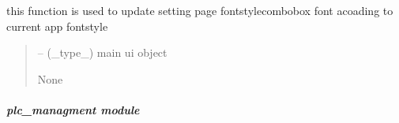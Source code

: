 \documentclass[letterpaper,10pt,english]{sphinxmanual}
\begin{document}

\begin{savenotes}\begin{fulllineitems}
\label{\detokenize{setting/backend/mainsetting_funcs:oxin.backend.mainsetting_funcs.update_combo_fontstyle}}
\pysigstartsignatures
{}
\pysigstopsignatures
\sphinxAtStartPar
this function is used to update setting page fontstyle\sphinxhyphen{}combobox font acoading to current app fontstyle
\begin{quote}\begin{description}
\sphinxAtStartPar
{} – (\_type\_) main ui object

\sphinxAtStartPar
None

\end{description}\end{quote}

\end{fulllineitems}\end{savenotes}


\sphinxstepscope


\subparagraph{plc\_managment module}
\label{\detokenize{setting/backend/plc_managment:module-oxin.backend.plc_managment}}\label{\detokenize{setting/backend/plc_managment:plc-managment-module}}\label{\detokenize{setting/backend/plc_managment::doc}}
\end{document}
